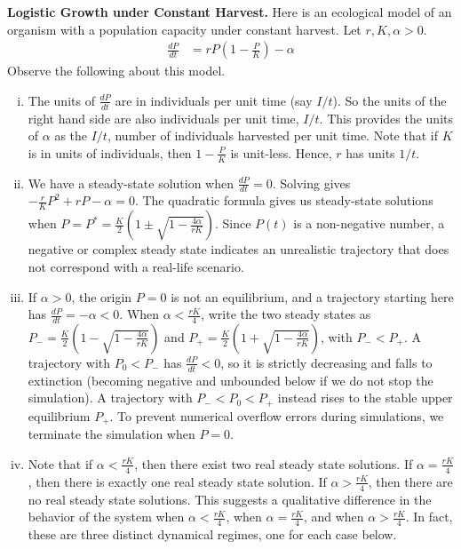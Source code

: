 \begin{example}\label{ex:const_harvest}
\textbf{Logistic Growth under Constant Harvest.}
Here is an ecological model of an organism with a population capacity under constant harvest. Let $r, K, \alpha > 0$.
\begin{align*}
\frac{dP}{dt} &= rP(1-\frac{P}{K}) - \alpha
\end{align*}
Observe the following about this model.
\begin{enumerate}[(i)]
\item The units of $\frac{dP}{dt}$ are in individuals per unit time (say $I/t$). So the units of the right hand side are also individuals per unit time, $I/t$. This provides the units of $\alpha$ as the $I/t$, number of individuals harvested per unit time. Note that if $K$ is in units of individuals, then $1 - \frac{P}{K}$ is unit-less. Hence, $r$ has units $1/t$.

\item We have a steady-state solution when $\frac{dP}{dt} = 0$. Solving gives $-\frac{r}{K}P^2 + rP - \alpha = 0$. The quadratic formula gives us steady-state solutions when $P = P^* = \frac{K}{2}\left(1 \pm \sqrt{1-\frac{4\alpha}{rK}}\right)$. Since $P(t)$ is a non-negative number, a negative or complex steady state indicates an unrealistic trajectory that does not correspond with a real-life scenario.

\item If $\alpha > 0$, the origin $P=0$ is not an equilibrium, and a trajectory starting here has $\frac{dP}{dt} = -\alpha < 0$. When $\alpha < \frac{rK}{4}$, write the two steady states as $P_- = \frac{K}{2}\left(1 - \sqrt{1-\frac{4\alpha}{rK}}\right)$ and $P_+ = \frac{K}{2}\left(1 + \sqrt{1-\frac{4\alpha}{rK}}\right)$, with $P_- < P_+$. A trajectory with $P_0 < P_-$ has $\frac{dP}{dt} < 0$, so it is strictly decreasing and falls to extinction (becoming negative and unbounded below if we do not stop the simulation). A trajectory with $P_- < P_0 < P_+$ instead rises to the stable upper equilibrium $P_+$. To prevent numerical overflow errors during simulations, we terminate the simulation when $P=0$.

\item Note that if $\alpha < \frac{rK}{4}$, then there exist two real steady state solutions. If $\alpha = \frac{rK}{4}$, then there is exactly one real steady state solution. If $\alpha > \frac{rK}{4}$, then there are no real steady state solutions. This suggests a qualitative difference in the behavior of the system when $\alpha < \frac{rK}{4}$, when $\alpha = \frac{rK}{4}$, and when $\alpha > \frac{rK}{4}$. In fact, these are three distinct dynamical regimes, one for each case below.


\end{enumerate}
\end{example}
